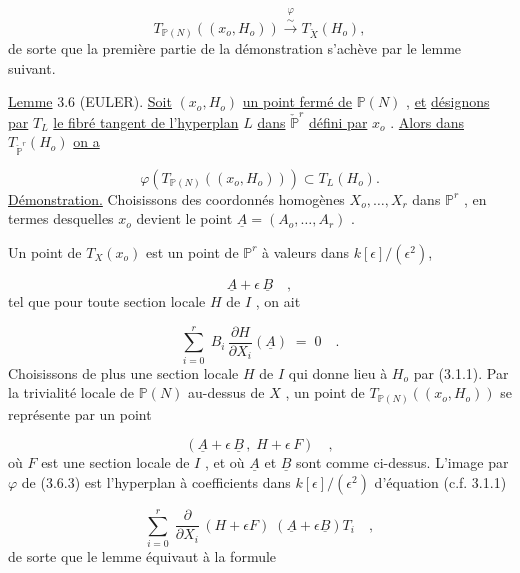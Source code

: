 \begin{equation}\tag{3.5.4}
T_{\mathbb{P}(N)}((x_o,H_o)) \overset{\varphi}{\overset{\sim}{\longrightarrow}} T_{\check{X}} (H_o) ,
\end{equation}
de sorte que la première partie de la démonstration s'achève par le lemme suivant.

\underline{Lemme} 3.6 (EULER). \underline{Soit} $(x_o, H_o)$ \underline{un point fermé de} $\mathbb{P}(N)$ , \underline{et} \underline{désignons par} $T_L$ \underline{le fibré tangent de l'hyperplan} $L$ \underline{dans} $\check{\mathbb{P}}^r$ \underline{défini par} $x_o$ . \underline{Alors dans} $T_{\check{\mathbb{P}}^r}(H_o)$ \underline{on a}

\begin{equation*}
\varphi (T_{\mathbb{P}(N)}((x_o, H_o))) \subset T_L(H_o) .
\end{equation*}
\underline{Démonstration.} Choisissons des coordonnés homogènes $X_o,\ldots,X_r$ dans $\mathbb{P}^r$ , en termes desquelles $x_o$ devient le point $\underline{A} = (A_o,\ldots,A_r)$ .



Un point de $T_X(x_o)$ est un point de $\mathbb{P}^r$ à valeurs dans $k[\epsilon]/(\epsilon^2)$,

\begin{equation}\tag{3.6.1}
\underline{A} + \epsilon \, \underline{B} \quad ,
\end{equation}
tel que pour toute section locale $H$ de $I$ , on ait

\begin{equation}\tag{3.6.2}
\sum_{i=0}^{r} \; B_i \, \frac{\partial H}{\partial X_i}(\underline{A}) \;=\; 0 \quad .
\end{equation}
Choisissons de plus une section locale $H$ de $I$ qui donne lieu à $H_o$ par (3.1.1). Par la trivialité locale de $\mathbb{P}(N)$ au-dessus de $X$ , un point de $T_{\mathbb{P}(N)}((x_o,H_o))$ se représente par un point

\begin{equation}\tag{3.6.3}
(\underline{A} + \epsilon \, \underline{B} \, , \; H + \epsilon \, F) \quad ,
\end{equation}
où $F$ est une section locale de $I$ , et où $\underline{A}$ et $\underline{B}$ sont comme ci-dessus. L'image par $\varphi$ de (3.6.3) est l'hyperplan à coefficients dans $k[\epsilon]/(\epsilon^2)$ d'équation (c.f. 3.1.1)

\begin{equation}\tag{3.6.4}
\sum_{i=0}^{r} \; \frac{\partial}{\partial X_i} \, (H+\epsilon F) \; (\underline{A}+\epsilon\underline{B})T_i \quad ,
\end{equation}
de sorte que le lemme équivaut à la formule


